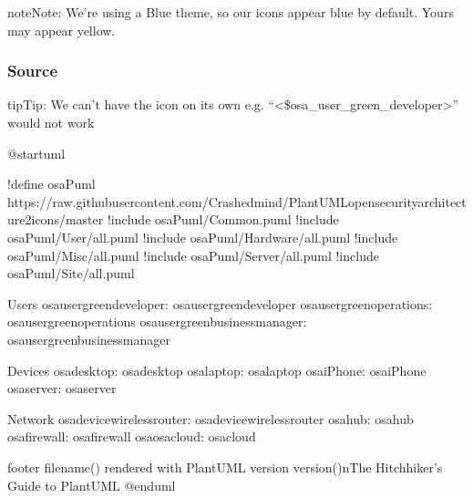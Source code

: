 \documentclass[letterpaper,10pt,english]{sphinxmanual}
\begin{document}
\begin{sphinxadmonition}{note}{Note:}
We’re using a Blue theme, so our icons appear blue by default. Yours may appear yellow.
\end{sphinxadmonition}

\begin{figure}[htbp]
\centering
\capstart

\caption{}\label{\detokenize{NetworkUsersMachines/NetworkUsersMachines:id17}}\end{figure}


\subsubsection{Source}
\label{\detokenize{NetworkUsersMachines/NetworkUsersMachines:id1}}
\begin{sphinxadmonition}{tip}{Tip:}
We can’t have the icon on its own e.g. “\textless{}\$osa\_user\_green\_developer\textgreater{}” would not work
\end{sphinxadmonition}

\begin{sphinxVerbatim}[commandchars=\\\{\},numbers=left,firstnumber=1,stepnumber=1]
@startuml

!define osaPuml https://raw.githubusercontent.com/Crashedmind/PlantUML\PYGZhy{}opensecurityarchitecture2\PYGZhy{}icons/master
!include osaPuml/Common.puml
!include osaPuml/User/all.puml
!include osaPuml/Hardware/all.puml
!include osaPuml/Misc/all.puml
!include osaPuml/Server/all.puml
!include osaPuml/Site/all.puml

\PYGZsq{} Users
osa\PYGZus{}user\PYGZus{}green\PYGZus{}developer: \PYGZlt{}\PYGZdl{}osa\PYGZus{}user\PYGZus{}green\PYGZus{}developer\PYGZgt{}
osa\PYGZus{}user\PYGZus{}green\PYGZus{}operations: \PYGZlt{}\PYGZdl{}osa\PYGZus{}user\PYGZus{}green\PYGZus{}operations\PYGZgt{}
osa\PYGZus{}user\PYGZus{}green\PYGZus{}business\PYGZus{}manager: \PYGZlt{}\PYGZdl{}osa\PYGZus{}user\PYGZus{}green\PYGZus{}business\PYGZus{}manager\PYGZgt{}

\PYGZsq{} Devices
osa\PYGZus{}desktop: \PYGZlt{}\PYGZdl{}osa\PYGZus{}desktop\PYGZgt{}
osa\PYGZus{}laptop: \PYGZlt{}\PYGZdl{}osa\PYGZus{}laptop\PYGZgt{}
osa\PYGZus{}iPhone: \PYGZlt{}\PYGZdl{}osa\PYGZus{}iPhone\PYGZgt{}
osa\PYGZus{}server: \PYGZlt{}\PYGZdl{}osa\PYGZus{}server\PYGZgt{}

\PYGZsq{} Network
osa\PYGZus{}device\PYGZus{}wireless\PYGZus{}router: \PYGZlt{}\PYGZdl{}osa\PYGZus{}device\PYGZus{}wireless\PYGZus{}router\PYGZgt{}
osa\PYGZus{}hub: \PYGZlt{}\PYGZdl{}osa\PYGZus{}hub\PYGZgt{}
osa\PYGZus{}firewall: \PYGZlt{}\PYGZdl{}osa\PYGZus{}firewall\PYGZgt{}
osa\PYGZus{}osa\PYGZus{}cloud: \PYGZlt{}\PYGZdl{}osa\PYGZus{}cloud\PYGZgt{}

footer \PYGZpc{}filename() rendered with PlantUML version \PYGZpc{}version()\PYGZbs{}nThe Hitchhiker’s Guide to PlantUML
@enduml
\end{sphinxVerbatim}
\end{document}
